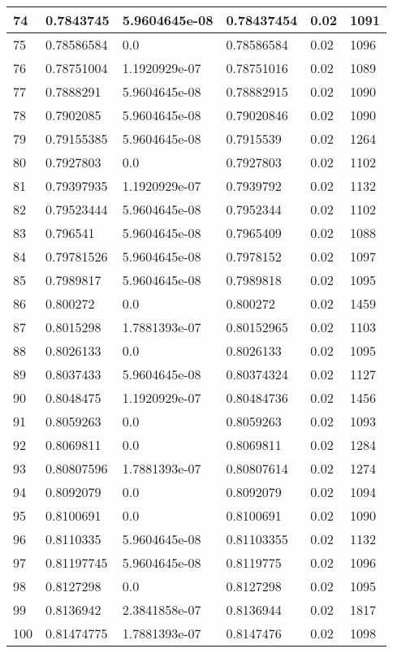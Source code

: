 \begin{longtable}{|l|l|l|l|l|l|}
74 & 0.7843745 & 5.9604645e-08 & 0.78437454 & 0.02 & 1091 \\ \hline 
75 & 0.78586584 & 0.0 & 0.78586584 & 0.02 & 1096 \\ \hline 
76 & 0.78751004 & 1.1920929e-07 & 0.78751016 & 0.02 & 1089 \\ \hline 
77 & 0.7888291 & 5.9604645e-08 & 0.78882915 & 0.02 & 1090 \\ \hline 
78 & 0.7902085 & 5.9604645e-08 & 0.79020846 & 0.02 & 1090 \\ \hline 
79 & 0.79155385 & 5.9604645e-08 & 0.7915539 & 0.02 & 1264 \\ \hline 
80 & 0.7927803 & 0.0 & 0.7927803 & 0.02 & 1102 \\ \hline 
81 & 0.79397935 & 1.1920929e-07 & 0.7939792 & 0.02 & 1132 \\ \hline 
82 & 0.79523444 & 5.9604645e-08 & 0.7952344 & 0.02 & 1102 \\ \hline 
83 & 0.796541 & 5.9604645e-08 & 0.7965409 & 0.02 & 1088 \\ \hline 
84 & 0.79781526 & 5.9604645e-08 & 0.7978152 & 0.02 & 1097 \\ \hline 
85 & 0.7989817 & 5.9604645e-08 & 0.7989818 & 0.02 & 1095 \\ \hline 
86 & 0.800272 & 0.0 & 0.800272 & 0.02 & 1459 \\ \hline 
87 & 0.8015298 & 1.7881393e-07 & 0.80152965 & 0.02 & 1103 \\ \hline 
88 & 0.8026133 & 0.0 & 0.8026133 & 0.02 & 1095 \\ \hline 
89 & 0.8037433 & 5.9604645e-08 & 0.80374324 & 0.02 & 1127 \\ \hline 
90 & 0.8048475 & 1.1920929e-07 & 0.80484736 & 0.02 & 1456 \\ \hline 
91 & 0.8059263 & 0.0 & 0.8059263 & 0.02 & 1093 \\ \hline 
92 & 0.8069811 & 0.0 & 0.8069811 & 0.02 & 1284 \\ \hline 
93 & 0.80807596 & 1.7881393e-07 & 0.80807614 & 0.02 & 1274 \\ \hline 
94 & 0.8092079 & 0.0 & 0.8092079 & 0.02 & 1094 \\ \hline 
95 & 0.8100691 & 0.0 & 0.8100691 & 0.02 & 1090 \\ \hline 
96 & 0.8110335 & 5.9604645e-08 & 0.81103355 & 0.02 & 1132 \\ \hline 
97 & 0.81197745 & 5.9604645e-08 & 0.8119775 & 0.02 & 1096 \\ \hline 
98 & 0.8127298 & 0.0 & 0.8127298 & 0.02 & 1095 \\ \hline 
99 & 0.8136942 & 2.3841858e-07 & 0.8136944 & 0.02 & 1817 \\ \hline 
100 & 0.81474775 & 1.7881393e-07 & 0.8147476 & 0.02 & 1098 \\ \hline 
\end{longtable}